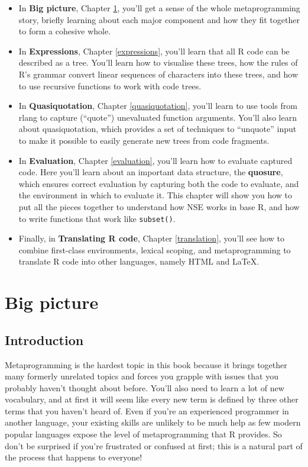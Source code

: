 \documentclass[]{book}
\begin{document}
\begin{itemize}
\item
  In \textbf{Big picture}, Chapter \ref{meta-big-picture}, you'll get a sense of
  the whole metaprogramming story, briefly learning about each major component
  and how they fit together to form a cohesive whole.
\item
  In \textbf{Expressions}, Chapter \ref{expressions}, you'll learn that all R code
  can be described as a tree. You'll learn how to visualise these trees, how
  the rules of R's grammar convert linear sequences of characters into these
  trees, and how to use recursive functions to work with code trees.
\item
  In \textbf{Quasiquotation}, Chapter \ref{quasiquotation}, you'll learn to use
  tools from rlang to capture (``quote'') unevaluated function arguments. You'll
  also learn about quasiquotation, which provides a set of techniques to
  ``unquote'' input to make it possible to easily generate new trees from
  code fragments.
\item
  In \textbf{Evaluation}, Chapter \ref{evaluation}, you'll learn how to evaluate
  captured code. Here you'll learn about an important data structure, the
  \textbf{quosure}, which ensures correct evaluation by capturing both the code
  to evaluate, and the environment in which to evaluate it. This chapter will
  show you how to put all the pieces together to understand how NSE works in
  base R, and how to write functions that work like \texttt{subset()}.
\item
  Finally, in \textbf{Translating R code}, Chapter \ref{translation}, you'll see
  how to combine first-class environments, lexical scoping, and metaprogramming
  to translate R code into other languages, namely HTML and LaTeX.
\end{itemize}

\hypertarget{meta-big-picture}{%
\chapter{Big picture}\label{meta-big-picture}}

\hypertarget{introduction}{%
\section{Introduction}\label{introduction}}

Metaprogramming is the hardest topic in this book because it brings together many formerly unrelated topics and forces you grapple with issues that you probably haven't thought about before. You'll also need to learn a lot of new vocabulary, and at first it will seem like every new term is defined by three other terms that you haven't heard of. Even if you're an experienced programmer in another language, your existing skills are unlikely to be much help as few modern popular languages expose the level of metaprogramming that R provides. So don't be surprised if you're frustrated or confused at first; this is a natural part of the process that happens to everyone!
\end{document}

